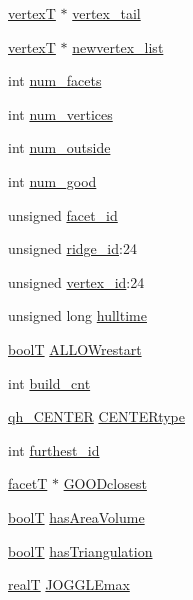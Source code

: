 \begin{DoxyCompactItemize}
\hyperlink{structvertexT}{vertex\+T} $\ast$ \hyperlink{structqhT_a6f5fcd2405c62bb2aa6bb1ac073bf1ec}{vertex\+\_\+tail}
\item 
\hyperlink{structvertexT}{vertex\+T} $\ast$ \hyperlink{structqhT_a783dd32a60a9a4732c6404fd04d3fd0a}{newvertex\+\_\+list}
\item 
int \hyperlink{structqhT_a039c1f86287f43c6bef6508b70ff6379}{num\+\_\+facets}
\item 
int \hyperlink{structqhT_a64a6735c74cb4125cd63d58fdebb8c77}{num\+\_\+vertices}
\item 
int \hyperlink{structqhT_a99ea6103e6759d20697b7cdbe75ff4f6}{num\+\_\+outside}
\item 
int \hyperlink{structqhT_ac5e9ff6b5d24b27e712bea3c5596af99}{num\+\_\+good}
\item 
unsigned \hyperlink{structqhT_a81c427f28f966605dda75b646e5f0535}{facet\+\_\+id}
\item 
unsigned \hyperlink{structqhT_a0996a54924bbd661482091237f8f6592}{ridge\+\_\+id}\+:24
\item 
unsigned \hyperlink{structqhT_a4b88a60863338eba0621d1ac3802e99c}{vertex\+\_\+id}\+:24
\item 
unsigned long \hyperlink{structqhT_a18f2fc6766731d60a4fbdfefe1f097f2}{hulltime}
\item 
\hyperlink{libqhull_8h_ab1a924b550e00cabe8c367e76b207ea5}{bool\+T} \hyperlink{structqhT_a6c3cf44f0184aaa6c1895dc85f122392}{A\+L\+L\+O\+Wrestart}
\item 
int \hyperlink{structqhT_af5acda08fa119d4cb1e78ccba441b600}{build\+\_\+cnt}
\item 
\hyperlink{libqhull_8h_aeeb130d1f0f5738fd06f5e029ea91cda}{qh\+\_\+\+C\+E\+N\+T\+E\+R} \hyperlink{structqhT_a097441fef2fa8d1af42c8ccdbc1d58ec}{C\+E\+N\+T\+E\+Rtype}
\item 
int \hyperlink{structqhT_abaaa410fd3d2ccd4994669feb1ba6672}{furthest\+\_\+id}
\item 
\hyperlink{structfacetT}{facet\+T} $\ast$ \hyperlink{structqhT_ad6731e92bd8ba751e25d9043607b1f97}{G\+O\+O\+Dclosest}
\item 
\hyperlink{libqhull_8h_ab1a924b550e00cabe8c367e76b207ea5}{bool\+T} \hyperlink{structqhT_acbf8624926a13c707f146425fcb2a73f}{has\+Area\+Volume}
\item 
\hyperlink{libqhull_8h_ab1a924b550e00cabe8c367e76b207ea5}{bool\+T} \hyperlink{structqhT_a839dd28ec4faa9e37520059127393ba5}{has\+Triangulation}
\item 
\hyperlink{user_8h_ad6fe71dff955732ea8682263e9540bb7}{real\+T} \hyperlink{structqhT_a9fa6a1e96c982a3d1912f30fd61f9da0}{J\+O\+G\+G\+L\+Emax}

\end{DoxyCompactItemize}
